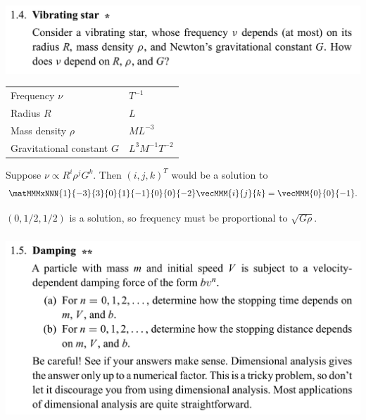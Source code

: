 \subsubsection*{}
\begin{mdframed}
  \includegraphics[width=400pt]{img/physics--classical-mechanics--morin--1-4.png}
\end{mdframed}
\begin{tabular}{l|l}
  Frequency $\nu$            & $T^{-1}$ \\
  Radius $R$                 & $L$ \\
  Mass density $\rho$        & $ML^{-3}$ \\
  Gravitational constant $G$ & $L^3M^{-1}T^{-2}$
\end{tabular}

Suppose $\nu \propto R^i\rho^jG^k$. Then $(i, j, k)^T$ would be a solution to
\begin{align*}
  \matMMMxNNN
  {1}{-3}{3}
  {0}{1}{-1}
  {0}{0}{-2} \vecMMM{i}{j}{k} = \vecMMM{0}{0}{-1}.
\end{align*}

$(0, 1/2, 1/2)$ is a solution, so frequency must be proportional to $\sqrt{G\rho}$. \checkmark

\subsubsection*{}
\begin{mdframed}
  \includegraphics[width=400pt]{img/physics--classical-mechanics--morin--1-5.png}
\end{mdframed}

